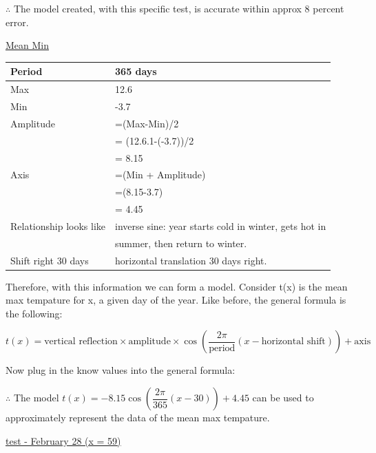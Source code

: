 \documentclass[12pt]{book}
\begin{document}
\begin{enumerate}
\begin{center}
    $\therefore$ The model created, with this specific test, is accurate within approx 8 percent error.
\end{center}

\vspace{0.7cm}
\underline{Mean Min}

\vspace{0.3cm}
\begin{tabular}{|l|l|}
    \hline
    Period & 365 days \\
    \hline
    Max & 12.6 \\
    \hline
    Min & -3.7 \\
    \hline
    Amplitude & =(Max-Min)/2\\
    & = (12.6.1-(-3.7))/2 \\
    & = 8.15 \\
    \hline
    Axis & =(Min + Amplitude)\\
    & =(8.15-3.7) \\
    & = 4.45 \\
    \hline
    Relationship looks like & inverse sine: year starts cold in winter, gets hot in \\
    & summer, then return to winter. \\
    \hline
    Shift right 30 days & horizontal translation 30 days right. \\
    \hline
\end{tabular}

\vspace{1cm}
Therefore, with this information we can form a model. 
Consider t(x) is the mean max tempature for x, a given day of the year. 
Like before, the general formula is the following:

$$t(x) = \text{vertical reflection} \times \text{amplitude} \times \cos\left( \dfrac{2\pi}{\text{period}}  (x - \text{horizontal shift}) \right) + \text{axis}$$

\newpage

\begin{center}
    Now plug in the know values into the general formula:
\end{center}

$\therefore$ The model $\boxed{t(x) = -8.15\cos\left( \dfrac{2\pi}{365} (x - 30) \right) + 4.45}$ can be used to approximately represent the data of the mean max tempature.

\vspace{0.3cm}
\underline{test - February 28 (x = 59)}


\end{enumerate}
\end{document}
